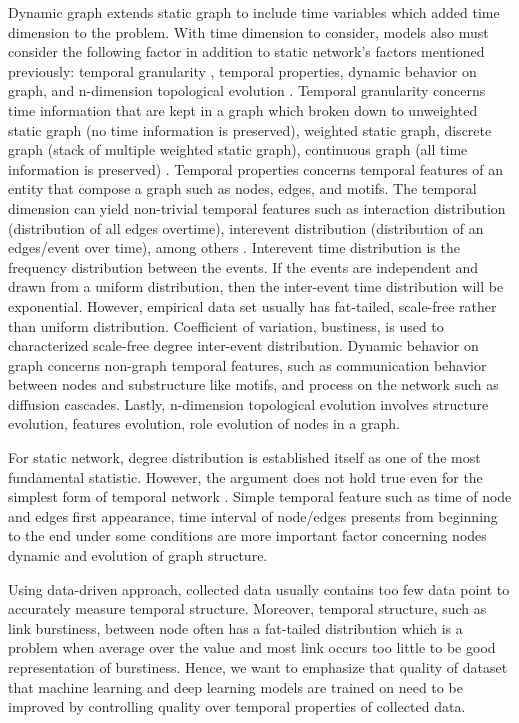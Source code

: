 \documentclass{IEEEtran}
\begin{document}
Dynamic graph extends static graph to include time variables which added time dimension to the problem. With time dimension to consider, models also must consider the following factor in addition to static network's factors mentioned previously: temporal granularity \cite{skardingFoundationsModelingDynamic2021}, temporal properties, dynamic behavior on graph, and n-dimension topological evolution \cite{holme2015modern,barrosSurveyEmbeddingDynamic2021}. Temporal granularity concerns time information that are kept in a graph which broken down to unweighted static graph (no time information is preserved), weighted static graph, discrete graph (stack of multiple weighted static graph), continuous graph (all time information is preserved) \cite{skardingFoundationsModelingDynamic2021}. Temporal properties concerns temporal features of an entity that compose a graph such as nodes, edges, and motifs. The temporal dimension can yield non-trivial temporal features such as interaction distribution (distribution of all edges overtime), interevent distribution (distribution of an edges/event over time), among others \cite{holme2012temporal,holme2015modern}. Interevent time distribution is the frequency distribution between the events. If the events are independent and drawn from a uniform distribution, then the inter-event time distribution will be exponential. However, empirical data set usually has fat-tailed, scale-free rather than uniform distribution. Coefficient of variation, bustiness, is used to characterized scale-free degree inter-event distribution. Dynamic behavior on graph concerns non-graph temporal features, such as communication behavior between nodes and substructure like motifs, and process on the network such as diffusion cascades. Lastly, n-dimension topological evolution involves structure evolution, features evolution, role evolution of nodes in a graph.

For static network, degree distribution is established itself as one of the most fundamental statistic. However, the argument does not hold true even for the simplest form of temporal network \cite{holme2015modern}. Simple temporal feature such as time of node and edges first appearance, time interval of node/edges presents from beginning to the end under some conditions are more important factor concerning nodes dynamic and evolution of graph structure.

Using data-driven approach, collected data usually contains too few data point to accurately measure temporal structure. Moreover, temporal structure, such as link burstiness, between node often has a fat-tailed distribution which is a problem when average over the value and most link occurs too little to be good representation of burstiness. Hence, we want to emphasize that quality of dataset that machine learning and deep learning models are trained on need to be improved by controlling quality over temporal properties of collected data. \cite{holme2015modern}
\end{document}

